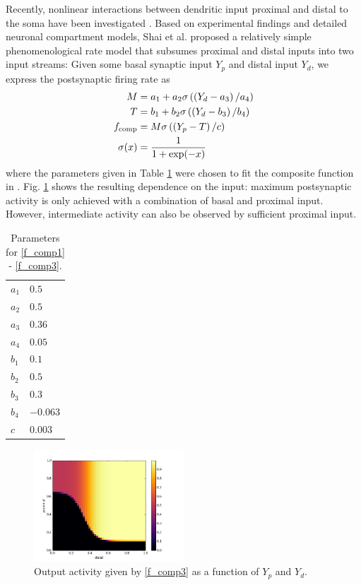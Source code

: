 \documentclass[10pt,a4paper]{article}
\begin{document}
Recently, nonlinear interactions between dendritic input proximal and distal to the soma have been investigated \cite{Shai_2015,Bono_2017}. Based on experimental findings and detailed neuronal compartment models, Shai et al. proposed a relatively simple phenomenological rate model that subsumes proximal and distal inputs into two input streams: Given some basal synaptic input $Y_p$ and distal input $Y_d$, we express the postsynaptic firing rate as
\begin{align}
M &= a_1 + a_2 \sigma \left( \left(Y_d-a_3\right) / a_4 \right) \label{f_comp1} \\ 
T &= b_1 + b_2 \sigma \left( \left(Y_d-b_3\right) / b_4 \right) \label{f_comp2}\\ 
f_{\rm comp} &= M \sigma \left(\left(Y_p - T \right) / c \right) \label{f_comp3}\\
\sigma (x) &= \frac{1}{1+\mathrm{exp}(-x)} \label{f_comp4}
\end{align}
where the parameters given in Table \ref{params_f_comp} were chosen to fit the composite function in \cite{Shai_2015}. Fig. \ref{fig:f_comp_plot} shows the resulting dependence on the input: maximum postsynaptic activity is only achieved with a combination of basal and proximal input. However, intermediate activity can also be observed by sufficient proximal input.
\begin{table}
\begin{center}
\caption{Parameters for \eqref{f_comp1} - \eqref{f_comp3}.}
\begin{tabular}{l|l}
$a_1$ & $0.5$ \\
$a_2$ & $0.5$ \\
$a_3$ & $0.36$ \\
$a_4$ & $0.05$ \\
$b_1$ & $0.1$ \\
$b_2$ & $0.5$ \\
$b_3$ & $0.3$ \\
$b_4$ & $-0.063$ \\
$c$ & $0.003$
\end{tabular}
\label{params_f_comp}
\end{center}
\end{table}

\begin{figure}
\centering
\includegraphics[width=0.5\textwidth]{../../plots/f_comp.png}
\caption{\label{fig:f_comp_plot} Output activity given by \eqref{f_comp3} as a function of $Y_p$ and $Y_d$.}
\end{figure}
\end{document}
